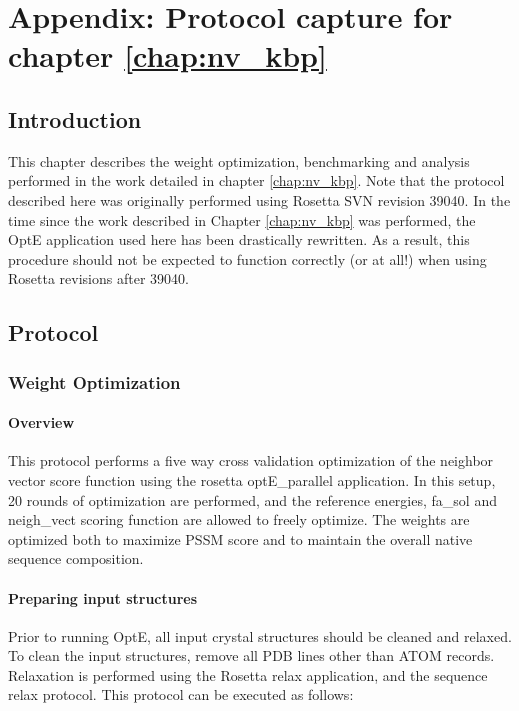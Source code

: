 \chapter{Appendix: Protocol capture for chapter \ref{chap:nv_kbp}}
\label{chap:nv_capture_appendix}
\section{Introduction}

This chapter describes the weight optimization, benchmarking and analysis performed in the work detailed in chapter \ref{chap:nv_kbp}.
Note that the protocol described here was originally performed using Rosetta SVN revision 39040.
In the time since the work described in Chapter \ref{chap:nv_kbp} was performed, the OptE application used here has been drastically rewritten.
As a result, this procedure should not be expected to function correctly (or at all!) when using Rosetta revisions after 39040.

\section{Protocol}

\subsection{Weight Optimization}
\label{subsec:nv_weight_opt}
\subsubsection{Overview}
This protocol performs a five way cross validation optimization of the neighbor vector score function using the rosetta optE\_parallel application.
In this setup, 20 rounds of optimization are performed, and the reference energies, fa\_sol and neigh\_vect scoring function are allowed to freely optimize.
The weights are optimized both to maximize \ac{PSSM} score and to maintain the overall native sequence composition.

\subsubsection{Preparing input structures}
\label{subsubsec:nv_input_prep}
Prior to running OptE, all input crystal structures should be cleaned and relaxed.
To clean the input structures, remove all \ac{PDB} lines other than ATOM records.
Relaxation is performed using the Rosetta relax application, and the sequence relax protocol.
This protocol can be executed as follows:

